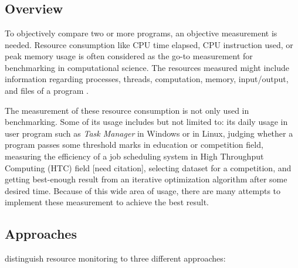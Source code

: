 \chapter{\babEmpat}

\section{Overview}

To objectively compare two or more programs, an objective measurement is needed.
Resource consumption like CPU time elapsed, CPU instruction used, or peak memory usage is often considered as the go-to measurement for benchmarking in computational science.
The resources measured might include information regarding processes, threads, computation, memory, input/output, and files of a program \citep{juvePracticalResourceMonitoring2015}.

The measurement of these resource consumption is not only used in benchmarking.
Some of its usage includes but not limited to:
its daily usage in user program such as \textit{Task Manager} in Windows or  in Linux,
judging whether a program passes some threshold marks in education or competition field,
measuring the efficiency of a job scheduling system in High Throughput Computing (HTC) field [need citation],
selecting dataset for a competition,
and getting best-enough result from an iterative optimization algorithm after some desired time.
Because of this wide area of usage, there are many attempts to implement these measurement to achieve the best result.


\section{Approaches}

\citet{juvePracticalResourceMonitoring2015} distinguish resource monitoring to three different approaches:

